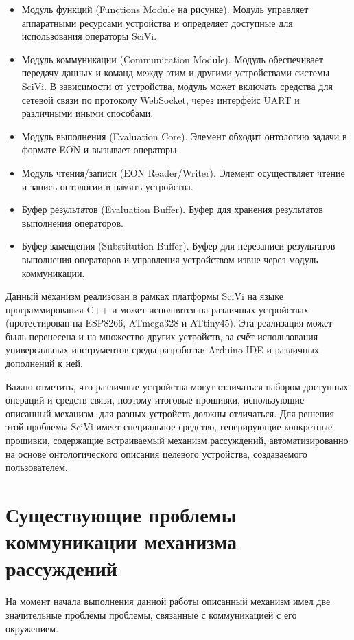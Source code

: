 \begin{itemize}
	\item Модуль функций (Functions Module на рисунке). Модуль управляет аппаратными ресурсами устройства и определяет доступные для использования операторы SciVi.
	\item Модуль коммуникации (Communication Module). Модуль обеспечивает передачу данных и команд между этим и другими устройствами системы SciVi.
	В зависимости от устройства, модуль может включать средства для сетевой связи по протоколу WebSocket, через интерфейс UART и различными иными способами.
	\item Модуль выполнения (Evaluation Core). Элемент обходит онтологию задачи в формате EON и вызывает операторы.
	\item Модуль чтения/записи (EON Reader/Writer). Элемент осуществляет чтение и запись онтологии в память устройства.
	\item Буфер результатов (Evaluation Buffer). Буфер для хранения результатов выполнения операторов.
	\item Буфер замещения (Substitution Buffer). Буфер для перезаписи результатов выполнения операторов и управления устройством извне через модуль коммуникации.
\end{itemize}

Данный механизм реализован в рамках платформы SciVi на языке программирования C++ и может исполнятся на различных устройствах (протестирован на ESP8266, ATmega328 и ATtiny45).
Эта реализация может быль перенесена и на множество других устройств, за счёт использования универсальных инструментов среды разработки Arduino IDE и различных дополнений к ней.

Важно отметить, что различные устройства могут отличаться набором доступных операций и средств связи, поэтому итоговые прошивки, использующие описанный механизм, для разных устройств должны отличаться.
Для решения этой проблемы SciVi имеет специальное средство, генерирующие конкретные прошивки, содержащие встраиваемый механизм рассуждений, автоматизированно на основе онтологического описания целевого устройства, создаваемого пользователем.

\section{Существующие проблемы коммуникации механизма рассуждений}

На момент начала выполнения данной работы описанный механизм имел две значительные проблемы проблемы, связанные с коммуникацией с его окружением.

